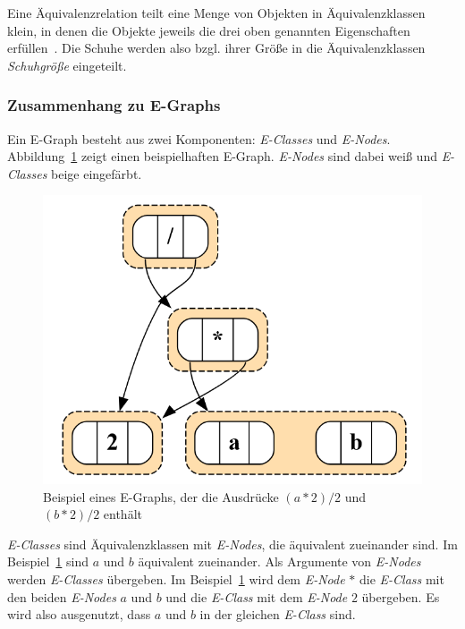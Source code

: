 Eine Äquivalenzrelation teilt eine Menge von Objekten in Äquivalenzklassen klein, in denen die Objekte jeweils die drei oben genannten Eigenschaften erfüllen~\cite{Ehrig2001}.
Die Schuhe werden also bzgl. ihrer Größe in die Äquivalenzklassen \textit{Schuhgröße} eingeteilt.

\subsubsection{Zusammenhang zu E-Graphs}

Ein E-Graph besteht aus zwei Komponenten: \textit{E-Classes} und \textit{E-Nodes}. Abbildung~\ref{fig:egraphexp} zeigt einen beispielhaften E-Graph.
\textit{E-Nodes} sind dabei weiß und \textit{E-Classes} beige eingefärbt.

\begin{figure}[H]
  \centering
  \includegraphics[scale=0.5]{../fig/egraph_exp.png}
  \caption{Beispiel eines E-Graphs, der die Ausdrücke $(a * 2) / 2$ und $(b * 2) / 2$ enthält}
  \label{fig:egraphexp}
\end{figure}

\textit{E-Classes} sind Äquivalenzklassen mit \textit{E-Nodes}, die äquivalent zueinander sind. Im Beispiel~\ref{fig:egraphexp} sind $a$ und $b$ äquivalent zueinander.
Als Argumente von \textit{E-Nodes} werden \textit{E-Classes} übergeben. Im Beispiel~\ref{fig:egraphexp} wird dem \textit{E-Node} $*$ die \textit{E-Class} mit den beiden 
\textit{E-Nodes} $a$ und $b$ und die \textit{E-Class} mit dem \textit{E-Node} $2$ übergeben. Es wird also ausgenutzt, dass $a$ und $b$ in der gleichen \textit{E-Class}
sind. 

